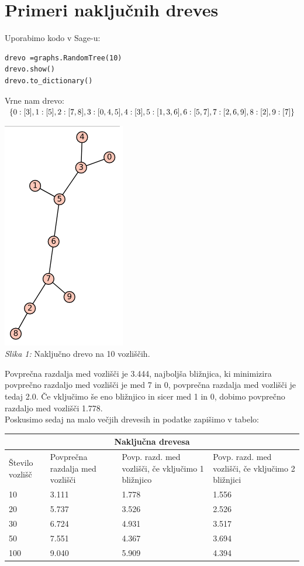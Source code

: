 \documentclass[a4paper,10pt]{article}
\begin{document}
\section{Primeri naključnih dreves}

Uporabimo kodo v Sage-u:
\begin{verbatim}
drevo =graphs.RandomTree(10)
drevo.show()
drevo.to_dictionary()
\end{verbatim}
Vrne nam drevo:$ \lbrace 0: [3], 1: [5], 2: [7, 8], 3: [0, 4, 5], 4: [3], \\ 5: [1, 3, 6], 6: [5, 7], 7: [2, 6, 9], 8: [2], 9: [7] \rbrace$
\begin{center}
\includegraphics[scale = 0.6]{graf1}\\ 
\scriptsize{\textit{Slika 1: } Naključno drevo na 10 vozliščih.}
\end{center}
Povprečna razdalja med vozlišči je 3.444, najboljša bližnjica, ki minimizira povprečno razdaljo med vozlišči je med 7 in 0, povprečna razdalja med vozlišči je tedaj 2.0. Če vključimo še eno bližnjico in sicer med 1 in 0, dobimo povprečno razdaljo med vozlišči 1.778.
\\[0.5cm]
Poskusimo sedaj na malo večjih drevesih in podatke zapišimo v tabelo:
\\[0.5cm]
\begin{tabular}{ |p{3cm}||p{3cm}|p{3cm}|p{3cm}|  }
 \hline
 \multicolumn{4}{|c|}{Naključna drevesa} \\
 \hline
 Število vozlišč& Povprečna razdalja med vozlišči &Povp. razd. med vozlišči, če vključimo 1 bližnjico&Povp. razd. med vozlišči, če vključimo 2 bližnjici\\
 \hline
 10   & 3.111    &1.778&   1.556\\
20&  5.737  & 3.526   &2.526\\
 30 &6.724 & 4.931& 3.517\\
 50    &7.551 & 4.367& 3.694\\
 100&  9.040  & 5.909&4.394\\
 \hline
\end{tabular}
\\[0.5cm]
\end{document}
